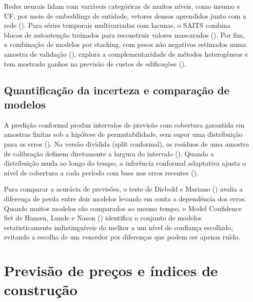  Redes neurais lidam com variáveis categóricas de muitos níveis, como insumo e UF, 
 por meio de embeddings de entidade, vetores densos aprendidos junto com a rede 
 (). Para séries temporais multivariadas com lacunas, o SAITS 
 combina blocos de autoatenção treinados para reconstruir valores mascarados 
 (). Por fim, a combinação de modelos por stacking, com pesos não 
 negativos estimados numa amostra de validação (), explora a 
 complementaridade de métodos heterogêneos e tem mostrado ganhos na previsão de custos 
 de edificações ().

\subsection{Quantificação da incerteza e comparação de modelos}

A predição conformal produz intervalos de previsão com cobertura garantida em amostras 
finitas sob a hipótese de permutabilidade, sem supor uma distribuição para os erros 
(). Na versão dividida (split conformal), os resíduos de 
uma amostra de calibração definem diretamente a largura do intervalo (). 
Quando a distribuição muda ao longo do tempo, a inferência conformal adaptativa ajusta o 
nível de cobertura a cada período com base nos erros recentes (). 

Para comparar a acurácia de previsões, o teste de Diebold e Mariano () avalia a 
diferença de perda entre dois modelos levando em conta a dependência dos erros. Quando 
muitos modelos são comparados ao mesmo tempo, o Model Confidence Set de Hansen, Lunde e 
Nason () identifica o conjunto de modelos estatisticamente indistinguíveis do melhor 
a um nível de confiança escolhido, evitando a escolha de um vencedor por diferenças que 
podem ser apenas ruído.

\section{Previsão de preços e índices de construção}

